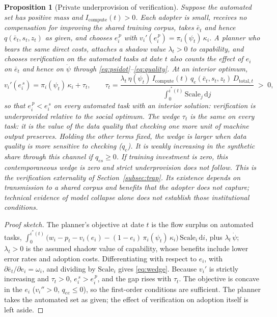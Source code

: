\documentclass[12pt]{article}
\theoremstyle{plain}
\newtheorem{proposition}{Proposition}[section]
\theoremstyle{definition}
\theoremstyle{remark}
\begin{document}
\begin{proposition}[Private underprovision of verification]\label{prop:underprovision}
Suppose the automated set has positive mass and
$I_{\mathrm{compute}}(t)>0$. Each adopter is small, receives no compensation for improving the
shared training corpus, takes $\bar{e}_t$ and hence
$q(\bar{e}_t,s_t,z_t)$
as given, and chooses $e_i^{\,p}$ with
$v_i'(e_i^{\,p}) = \pi_i(\psi_t)\,\kappa_i$. A planner who bears the same
direct costs, attaches a shadow value $\lambda_t > 0$ to capability, and
chooses verification on the automated tasks at date $t$ also counts the
effect of $e_i$ on $\bar{e}_t$ and hence
on $\dot{\psi}$ through \eqref{eq:psidot}--\eqref{eq:quality}. At an
interior optimum,
\begin{equation}\label{eq:wedge}
v_i'(e_i^{\,s}) = \pi_i(\psi_t)\,\kappa_i + \tau_t,
\qquad
\tau_t = \frac{\lambda_t\,\eta(\psi_t)\, I_{\mathrm{compute}}(t)\,
         q_e(\bar{e}_t,s_t,z_t)\, D_{\mathrm{total},t}}
        {\int_0^{i^{*}(t)} \mathrm{Scale}_j\,\mathrm{d}j} \;>\; 0,
\end{equation}
so that $e_i^{\,p} < e_i^{\,s}$ on every automated task with an interior
solution:
verification is underprovided relative to the social optimum. The wedge
$\tau_t$ is the same on every task: it is the value of the data quality
that checking one more unit of machine output preserves. Holding the other terms fixed, the wedge is larger when data quality
is more sensitive to checking ($q_e$). It is weakly increasing in the
synthetic share through this channel if $q_{es} \ge 0$. If training
investment is zero, this contemporaneous wedge is zero and strict
underprovision does not follow. This is the verification externality of Section~\ref{subsec:trap}.
Its existence depends on transmission to a shared corpus and benefits
that the adopter does not capture; technical evidence of model collapse
alone does not establish those institutional conditions.
\end{proposition}

\begin{proof}[Proof sketch]
The planner's objective at date $t$ is the flow surplus on automated
tasks,
$\int_0^{i^{*}(t)} \big(w_i - p_t - v_i(e_i)
- (1-e_i)\,\pi_i(\psi_t)\,\kappa_i\big)\,\mathrm{Scale}_i\,\mathrm{d}i$,
plus $\lambda_t\,\dot{\psi}$; $\lambda_t>0$ is the assumed shadow value of capability, whose benefits
include lower error rates and adoption costs. Differentiating with respect to
$e_i$, with $\partial \bar{e}_t/\partial e_i = \omega_i$, and dividing by
$\mathrm{Scale}_i$ gives \eqref{eq:wedge}. Because $v_i'$ is strictly
increasing and $\tau_t > 0$, $e_i^{\,s} > e_i^{\,p}$, and the gap rises
with $\tau_t$. The objective is concave in the $e_i$ ($v_i'' > 0$,
$q_{ee} \le 0$), so the first-order conditions are sufficient. The
planner takes the automated set as given; the effect of verification on
adoption itself is left aside.
\end{proof}
\end{document}
